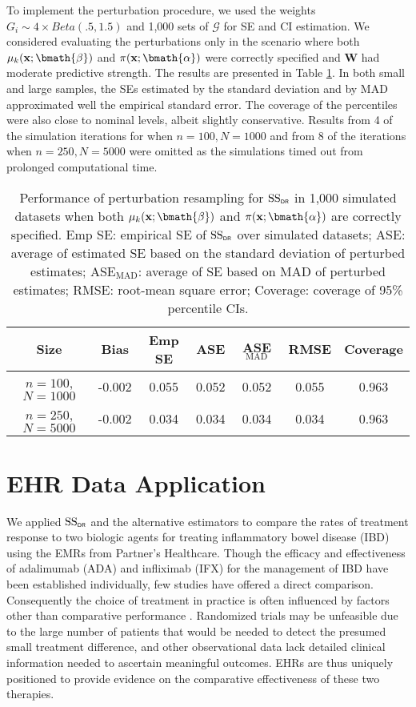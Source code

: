 \documentclass[useAMS,referee,usenatbib]{biom}
\def\bx{\mathbf{x}}
\def\bW{\mathbf{W}}
\def\balph{\bmath{\alpha}}
\def\bbeta{\bmath{\beta}}
\def\Gscr{\mathcal{G}}
\def\SSDR{\mbox{SS}_{\sf \scriptscriptstyle DR}}
\begin{document}
To implement the perturbation procedure, we used the weights $G_i \sim 4 \times Beta(.5,1.5)$ and 1,000 sets of $\Gscr$ for SE and CI estimation.  
We considered evaluating the perturbations only in the scenario where both $\mu_k(\bx;\bbeta)$ and $\pi(\bx;\balph)$ were correctly specified and $\bW$ had moderate predictive strength.  
The results are presented in Table \ref{tab:CIsim}. 
In both small and large samples, the SEs estimated by the standard deviation and by MAD approximated well the empirical 
standard error.  The coverage of the percentiles were also close to nominal levels, albeit slightly conservative.  Results from 
4 of the simulation iterations for when $n=100, N=1000$ and from 8 of the iterations when $n=250, N=5000$ were omitted as
the simulations timed out from prolonged computational time.

\begin{table}[h!]
    \caption{Performance of perturbation resampling for $\SSDR$ in 1,000 simulated datasets when both $\mu_k(\bx;\bbeta)$ and $\pi(\bx;\balph)$ are correctly specified.  Emp SE: empirical SE of $\SSDR$ over simulated datasets; ASE: average of estimated SE based on the standard deviation of perturbed estimates; ASE$_{\text{MAD}}$: average of SE based on MAD of perturbed estimates; RMSE: root-mean square error; Coverage: coverage of 95\% percentile CIs.}
    \label{tab:CIsim}
    \begin{center}
    \begin{tabular}{ccccccc}
        \toprule
        \textbf{Size} & \textbf{Bias} & \textbf{Emp SE} & \textbf{ASE} & \textbf{ASE$_{\text{MAD}}$} & \textbf{RMSE} & \textbf{Coverage} \\
        \midrule
        $n = 100$, $N=1000$ &  -0.002 & 0.055 & 0.052 & 0.052 & 0.055 & 0.963 \\
        $n = 250$, $N=5000$ & -0.002 & 0.034 & 0.034 & 0.034 & 0.034 & 0.963 \\ 
        \bottomrule
    \end{tabular}
    \end{center}
\end{table}

\section{EHR Data Application}
\label{s:data}
We applied $\SSDR$ and the alternative estimators to compare the rates of treatment response to two biologic agents for treating inflammatory bowel disease (IBD) using the EMRs from Partner's Healthcare.  Though the efficacy and effectiveness of adalimumab (ADA) and infliximab (IFX) for  the management of IBD have been established individually, few studies have offered a direct comparison. Consequently the choice of treatment in practice is often influenced by factors other than comparative performance \citep{ananthakrishnan2016comparative}.  Randomized trials may be unfeasible due to the large number of patients that would be needed to detect the presumed small treatment difference, and other observational data lack detailed clinical information needed to ascertain meaningful outcomes.  EHRs are thus uniquely positioned to provide evidence on the comparative effectiveness of these two therapies.  
\end{document}
